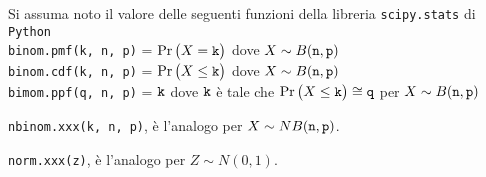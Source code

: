 \documentclass[11pt,twoside,a4paper]{article}
\begin{document}
Si assuma noto il valore delle seguenti funzioni della libreria {\tt scipy.stats\/} di  {\tt Python\/}\\
{\tt binom.pmf(k, n, p)} = $\Pr\big(X={\tt k}\big)$ dove $X\sim B({\tt n},{\tt p})$\\
{\tt binom.cdf(k, n, p)} = $\Pr\big(X\le{\tt k}\big)$ dove  $X\sim B({\tt n},{\tt p})$ \\
{\tt bimom.ppf(q, n, p)} = ${\tt k}$ dove ${\tt k}$ è tale che $\Pr\big(X\le{\tt k}\big)\cong{\tt q}$ per $X\sim B({\tt n},{\tt p})$ 

{\tt nbinom.xxx(k, n, p)}, è l'analogo per $X\sim NB({\tt n},{\tt p})$.

{\tt norm.xxx(z)}, è l'analogo per $Z\sim N(0,1)$.
\end{document}
